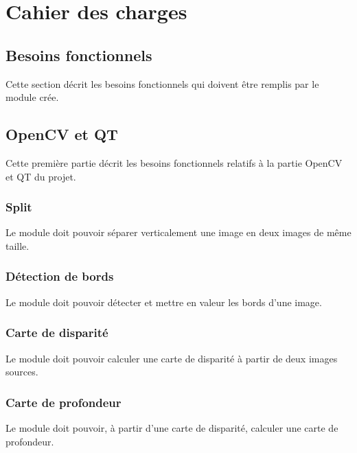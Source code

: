\documentclass[a4paper]{article}
\begin{document}

\section{Cahier des charges}

\subsection{Besoins fonctionnels}

Cette section décrit les besoins fonctionnels qui doivent être remplis par le
module crée.

\subsection*{OpenCV et QT}

Cette première partie décrit les besoins fonctionnels relatifs à la partie OpenCV
et QT du projet.

\subsubsection*{Split}

Le module doit pouvoir séparer verticalement une image en deux images de même taille.

\subsubsection*{Détection de bords}

Le module doit pouvoir détecter et mettre en valeur les bords d'une image.

\subsubsection*{Carte de disparité}

Le module doit pouvoir calculer une carte de disparité à partir de deux images
sources.

\subsubsection*{Carte de profondeur}

Le module doit pouvoir, à partir d'une carte de disparité, calculer une carte de
profondeur.
\end{document}
